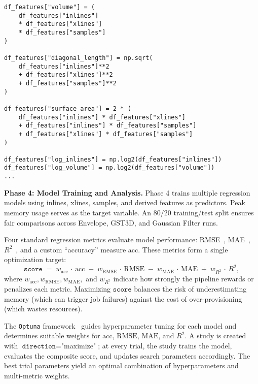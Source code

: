 \begin{lstlisting}[style=pythonstyle,
    caption={Feature extraction excerpt from \texttt{collect\_results.py}~\cite{delucca2025experiment2resultscollection}. Additional derived metrics capture polynomial or ratio-based growth.},
    label={lst:results_py}]
df_features["volume"] = (
    df_features["inlines"]
    * df_features["xlines"]
    * df_features["samples"]
)

df_features["diagonal_length"] = np.sqrt(
    df_features["inlines"]**2
    + df_features["xlines"]**2
    + df_features["samples"]**2
)

df_features["surface_area"] = 2 * (
    df_features["inlines"] * df_features["xlines"]
    + df_features["inlines"] * df_features["samples"]
    + df_features["xlines"] * df_features["samples"]
)

df_features["log_inlines"] = np.log2(df_features["inlines"])
df_features["log_volume"] = np.log2(df_features["volume"])
...
\end{lstlisting}

\vspace{1em}
\noindent
\textbf{Phase 4: Model Training and Analysis.}
Phase 4 trains multiple regression models using inlines, xlines, samples, and derived features as predictors.
Peak memory usage serves as the target variable.
An 80/20 training/test split ensures fair comparisons across Envelope, \ac{GST3D}, and Gaussian Filter runs.

Four standard regression metrics evaluate model performance:
\ac{RMSE}~\cite{hyndman2006},
\ac{MAE}~\cite{willmott2005mae},
\(R^2\)~\cite{draper1998applied},
and a custom “accuracy” measure \(\mathrm{acc}\).
These metrics form a single optimization target:
\[
    \texttt{score} \;=\;
    w_\mathrm{acc}\,\cdot\,\mathrm{acc}
    \;-\;
    w_\mathrm{RMSE}\,\cdot\,\mathrm{RMSE}
    \;-\;
    w_\mathrm{MAE}\,\cdot\,\mathrm{MAE}
    \;+\;
    w_{R^2}\,\cdot\,R^2,
\]
where \(w_\mathrm{acc}, w_\mathrm{RMSE}, w_\mathrm{MAE},\) and \(w_{R^2}\) indicate how strongly the pipeline rewards or penalizes each metric.
Maximizing \(\texttt{score}\) balances the risk of underestimating memory (which can trigger job failures) against the cost of over-provisioning (which wastes resources).

The \texttt{Optuna} framework~\cite{akiba2019optuna} guides hyperparameter tuning for each model and determines suitable weights for \(\mathrm{acc}\), \(\mathrm{RMSE}\), \(\mathrm{MAE}\), and \(R^2\).
A study is created with \(\texttt{direction}=\text{"maximize"}\); at every trial, the study trains the model, evaluates the composite score, and updates search parameters accordingly.
The best trial parameters yield an optimal combination of hyperparameters and multi-metric weights.

